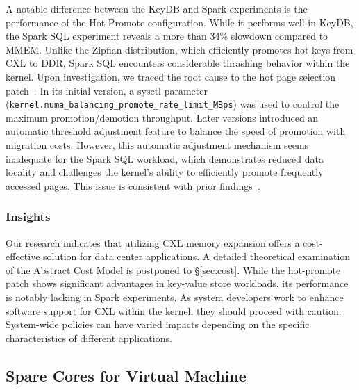 A notable difference between the KeyDB and Spark experiments is the performance of the Hot-Promote configuration. While it performs well in KeyDB, the Spark SQL experiment reveals a more than $34\%$ slowdown compared to MMEM. Unlike the Zipfian distribution, which efficiently promotes hot keys from CXL to DDR, Spark SQL encounters considerable thrashing behavior within the kernel. Upon investigation, we traced the root cause to the hot page selection patch~\cite{hot}. In its initial version, a sysctl parameter (\texttt{kernel.numa\_balancing\_promote\_rate\_limit\_MBps}) was used to control the maximum promotion/demotion throughput. Later versions introduced an automatic threshold adjustment feature to balance the speed of promotion with migration costs. However, this automatic adjustment mechanism seems inadequate for the Spark SQL workload, which demonstrates reduced data locality and challenges the kernel's ability to efficiently promote frequently accessed pages. This issue is consistent with prior findings~\cite{demystify}.

\subsubsection{Insights}

Our research indicates that utilizing CXL memory expansion offers a cost-effective solution for data center applications. A detailed theoretical examination of the Abstract Cost Model is postponed to \S\ref{sec:cost}. While the hot-promote patch shows significant advantages in key-value store workloads, its performance is notably lacking in Spark experiments. As system developers work to enhance software support for CXL within the kernel, they should proceed with caution. System-wide policies can have varied impacts depending on the specific characteristics of different applications.

\subsection{Spare Cores for Virtual Machine}

